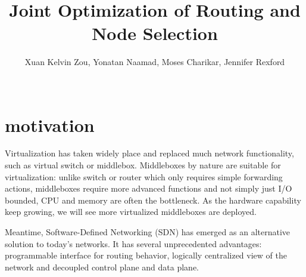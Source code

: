 \documentclass{sig-alternate}
\begin{document}
\title{Joint Optimization of Routing and Node Selection}
\author{
\alignauthor Xuan Kelvin Zou, Yonatan Naamad, Moses Charikar, Jennifer Rexford\\
\\
}
\begin{comment}
\begin{abstract} \small\baselineskip=9pt This is the text of my abstract. It is a brief
description of my
paper, outlining the purposes and goals I am trying to address.\end{abstract}
\end{comment}

\section{motivation}
Virtualization has taken widely place and replaced much network functionality, such as virtual switch or middlebox. Middleboxes by nature are suitable for virtualization: unlike switch or router which only requires simple forwarding actions, middleboxes require more advanced functions and not simply just I/O bounded, CPU and memory are often the bottleneck. As the hardware capability keep growing, we will see more virtualized middleboxes are deployed. 

Meantime, Software-Defined Networking (SDN) has emerged as an alternative solution to today's networks. It has several unprecedented advantages: programmable interface for routing behavior, logically centralized view of the network and decoupled control plane and data plane. 
\end{document}
